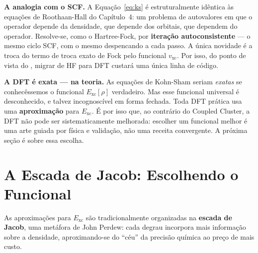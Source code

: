 \begin{caixanota}
\textbf{A analogia com o SCF.} A Equação~\ref{eq:ks} é estruturalmente idêntica às
equações de Roothaan-Hall do Capítulo~4: um problema de autovalores em que o
operador depende da densidade, que depende dos orbitais, que dependem do operador.
Resolve-se, como o Hartree-Fock, por \textbf{iteração autoconsistente} --- o mesmo
ciclo SCF, com o mesmo  despencando a cada passo. A única novidade é a
troca do termo de troca exato de Fock pelo funcional $v_{\text{xc}}$. Por isso, do
ponto de vista do \pyscf{}, migrar de HF para DFT custará uma única linha de
código.
\end{caixanota}

\begin{caixaatencao}
\textbf{A DFT é exata --- na teoria.} As equações de Kohn-Sham seriam
\emph{exatas} se conhecêssemos o funcional $E_{\text{xc}}[\rho]$ verdadeiro. Mas
esse funcional universal é desconhecido, e talvez incognoscível em forma fechada.
Toda DFT prática usa uma \textbf{aproximação} para $E_{\text{xc}}$. É por isso que,
ao contrário do Coupled Cluster, a DFT não pode ser sistematicamente melhorada:
escolher um funcional melhor é uma arte guiada por física e validação, não uma
receita convergente. A próxima seção é sobre essa escolha.
\end{caixaatencao}

\section{A Escada de Jacob: Escolhendo o Funcional}
\label{sec:funcionais}

As aproximações para $E_{\text{xc}}$ são tradicionalmente organizadas na
\textbf{escada de Jacob}, uma metáfora de John Perdew: cada degrau incorpora mais
informação sobre a densidade, aproximando-se do ``céu'' da precisão química ao
preço de mais custo.

